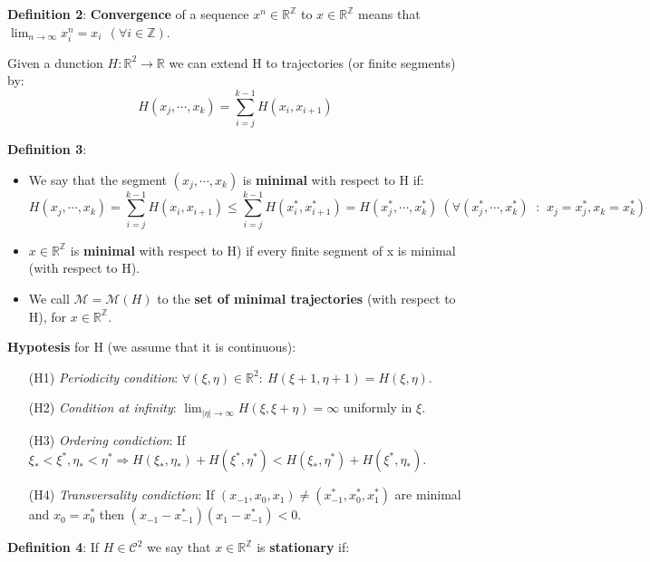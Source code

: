 \documentclass{article}
\begin{document}
\noindent \textbf{Definition 2}: \textbf{Convergence} of a sequence $x^n \in \mathbb{R}^{\mathbb{Z}}$ to $x \in \mathbb{R}^{\mathbb{Z}}$ means that $\lim_{n \rightarrow \infty } x_{i}^{n} = x_{i} \ \ (\forall i \in \mathbb{Z})$.
		
\noindent Given a dunction $H: \mathbb{R}^2 \rightarrow \mathbb{R}$ we can extend H to trajectories (or finite segments) by:
	$$
		H (x_j, \cdots, x_k) = \sum_{i = j}^{k - 1} H ( x_i, x_{i + 1} ) 
	$$
	
\noindent \textbf{Definition 3}:
\begin{itemize}
	\item We say that the segment $(x_j, \cdots, x_k)$ is \textbf{minimal} with respect to H if:
	$$
		H ( x_j, \cdots, x_k) = \sum_{i = j}^{k - 1} H ( x_i, x_{i + 1} )  \leq \sum_{i = j}^{k - 1} H ( x_{i}^{*}, x_{i + 1}^{*} ) = H (x_{j}^{*}, \cdots, x_{k}^{*}) \  (   \forall (x_{j}^{*}, \cdots, x_{k}^{*})  \ \text{ : } \ x_j =  x_{j}^{*}, x_k = x_{k}^{*}   )
	$$
	
	\item $x \in \mathbb{R}^{\mathbb{Z}}$ is \textbf{minimal} with respect to H) if every finite segment of x is minimal (with respect to H).
	
	\item We call $\mathcal{M} = \mathcal{M}(H)$ to the \textbf{set of minimal trajectories} (with respect to H), for $x \in \mathbb{R}^{\mathbb{Z}}$.
\end{itemize}
 
\noindent \textbf{Hypotesis} for H (we assume that it is continuous):
\begin{itemize}
	\item[(H1)] \textit{Periodicity condition}: $ \forall (\xi, \eta) \in \mathbb{R}^{2}: \ H( \xi + 1, \eta + 1) = H(\xi, \eta)$.
	\item[(H2)] \textit{Condition at infinity}: $\lim_{|\eta | \rightarrow \infty } H (\xi, \xi + \eta) = \infty$ uniformly in $\xi$.
	\item[(H3)] \textit{Ordering condiction}: If $\xi_{*} < \xi^{*}, \eta_{*} < \eta^{*} \Rightarrow H( \xi_{*}, \eta_{*}) + H( \xi^{*}, \eta^{*}) < H( \xi_{*}, \eta^{*}) + H( \xi^{*}, \eta_{*})$.
	\item[(H4)] \textit{Transversality condiction}: If $(x_{-1}, x_{0}, x_{1}) \neq (x_{-1}^{*}, x_{0}^{*}, x_{1}^{*})$ are minimal and $x_0 = x_{0}^{*}$ then $(x_{-1} - x_{-1}^{*})(x_{1} - x_{-1}^{*}) < 0$.
\end{itemize}  

\noindent \textbf{Definition 4}: If $H \in \mathcal{C}^{2}$ we say that $x \in \mathbb{R}^{\mathbb{Z}}$ is \textbf{stationary} if:
\end{document}
